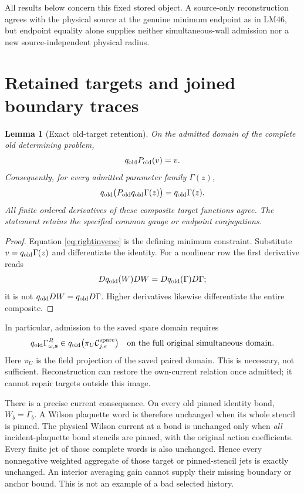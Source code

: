 \documentclass[11pt,letterpaper]{article}
\numberwithin{equation}{section}
\theoremstyle{plain}
\newtheorem{lemma}[theorem]{Lemma}
\theoremstyle{remark}\newtheorem{remark}[theorem]{Scope}
\begin{document}
All results below concern this fixed stored object. A source-only
reconstruction agrees with the physical source at the genuine minimum
endpoint as in LM46, but endpoint equality alone supplies neither
simultaneous-wall admission nor a new source-independent physical radius.

\section{Retained targets and joined boundary traces}

\begin{lemma}[Exact old-target retention]
On the admitted domain of the complete old determining problem,
\begin{equation}
 q_{\rm old}P_{\rm old}(v)=v.
 \label{eq:rightinverse}
\end{equation}
Consequently, for every admitted parameter family $\Gamma(z)$,
\begin{equation}
 q_{\rm old}\bigl(P_{\rm old}q_{\rm old}\Gamma(z)\bigr)
 =q_{\rm old}\Gamma(z).
 \label{eq:targetidentity}
\end{equation}
All finite ordered derivatives of these composite target functions agree.
The statement retains the specified common gauge or endpoint conjugations.
\end{lemma}
\begin{proof}
Equation \eqref{eq:rightinverse} is the defining minimum constraint.
Substitute $v=q_{\rm old}\Gamma(z)$ and differentiate the identity.
For a nonlinear row the first derivative reads
\[
 Dq_{\rm old}(W)DW=Dq_{\rm old}(\Gamma)D\Gamma;
\]
it is not $q_{\rm old}DW=q_{\rm old}D\Gamma$. Higher derivatives likewise
differentiate the entire composite.
\end{proof}

In particular, admission to the saved spare domain requires
\begin{equation}
 q_{\rm old}\Gamma^R_{\omega,\mathbf s}
 \in q_{\rm old}\bigl(\pi_U\mathcal C^{\rm spare}_{j,e}\bigr)
 \quad\hbox{on the full original simultaneous domain}.
 \label{eq:necessary}
\end{equation}
Here $\pi_U$ is the field projection of the saved paired domain.
This is necessary, not sufficient. Reconstruction can restore the
own-current relation once admitted; it cannot repair targets outside this
image.

There is a precise current consequence. On every old pinned identity bond,
$W_b=\Gamma_b$. A Wilson plaquette word is therefore unchanged when its
whole stencil is pinned. The physical Wilson current at a bond is unchanged
only when \emph{all} incident-plaquette bond stencils are pinned, with the
original action coefficients. Every finite jet of those complete words is
also unchanged. Hence every nonnegative weighted aggregate of those target
or pinned-stencil jets is exactly unchanged. An interior averaging gain
cannot supply their missing boundary or anchor bound. This is not an
example of a bad selected history.
\end{document}
